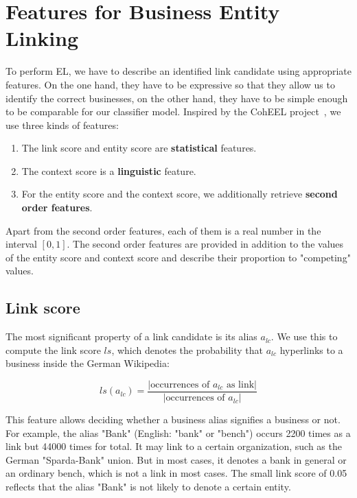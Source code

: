 \section{Features for Business Entity Linking}
\label{sec:features}
To perform EL, we have to describe an identified link candidate using appropriate features. On the one hand, they have to be expressive so that they allow us to identify the correct businesses, on the other hand, they have to be simple enough to be comparable for our classifier model. Inspired by the CohEEL project~\cite{coheel}, we use three kinds of features:

\begin{enumerate}
\item The link score and entity score are \textbf{statistical} features.
\item The context score is a \textbf{linguistic} feature.
\item For the entity score and the context score, we additionally retrieve \textbf{second order features}.
\end {enumerate}

Apart from the second order features, each of them is a real number in the interval $[0, 1]$. The second order features are provided in addition to the values of the entity score and context score and describe their proportion to "competing" values.



\subsection{Link score}
\label{sec:link_score}
The most significant property of a link candidate is its alias $a_{lc}$. We use this to compute the link score $ls$, which denotes the probability that $a_{lc}$ hyperlinks to a business inside the German Wikipedia:

\begin{equation*} %
ls(a_{lc}) = \frac{|\text{occurrences of $a_{lc}$ as link}|}{|\text{occurrences of $a_{lc}$}|}
\end{equation*}

This feature allows deciding whether a business alias signifies a business or not. For example, the alias "Bank" (English: "bank" or "bench") occurs 2200 times as a link but 44000 times for total. It may link to a certain organization, such as the German "Sparda-Bank" union. But in most cases, it denotes a bank in general or an ordinary bench, which is not a link in most cases. The small link score of 0.05 reflects that the alias "Bank" is not likely to denote a certain entity.



